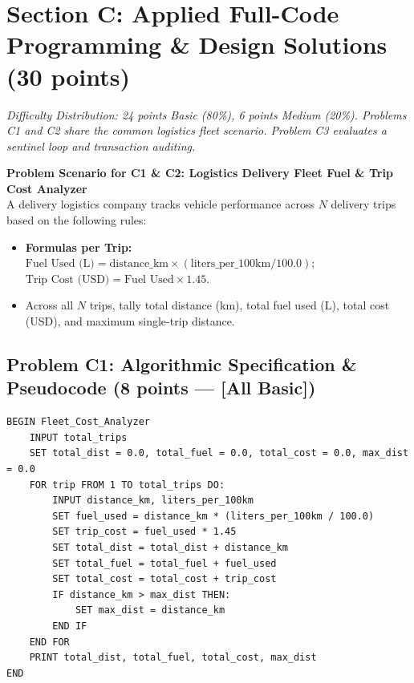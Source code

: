 \documentclass[11pt,a4paper]{article}
\begin{document}
\newpage

\section*{Section C: Applied Full-Code Programming \& Design Solutions (30 points)}
\textit{Difficulty Distribution: 24 points Basic (80\%), 6 points Medium (20\%). Problems C1 and C2 share the common logistics fleet scenario. Problem C3 evaluates a sentinel loop and transaction auditing.}

\begin{tcolorbox}[colback=boxbg, colframe=secondaryteal, arc=1.2mm, boxrule=0.6pt, left=2.0mm, right=2.0mm, top=0.6mm, bottom=0.6mm]
\textbf{\small Problem Scenario for C1 \& C2: Logistics Delivery Fleet Fuel \& Trip Cost Analyzer}\\[0.1mm]
\footnotesize
A delivery logistics company tracks vehicle performance across $N$ delivery trips based on the following rules:
\begin{itemize}[itemsep=0.1pt,topsep=0.1pt]
  \item \textbf{Formulas per Trip:}
    $\text{Fuel Used (L)} = \text{distance\_km} \times (\text{liters\_per\_100km} / 100.0)$; \quad
    $\text{Trip Cost (USD)} = \text{Fuel Used} \times 1.45$.
  \item Across all $N$ trips, tally total distance (km), total fuel used (L), total cost (USD), and maximum single-trip distance.
\end{itemize}
\end{tcolorbox}

\vspace{0.2mm}
\subsection*{Problem C1: Algorithmic Specification \& Pseudocode (8 points --- [All Basic])}

\begin{lstlisting}[language={}]
BEGIN Fleet_Cost_Analyzer
    INPUT total_trips
    SET total_dist = 0.0, total_fuel = 0.0, total_cost = 0.0, max_dist = 0.0
    FOR trip FROM 1 TO total_trips DO:
        INPUT distance_km, liters_per_100km
        SET fuel_used = distance_km * (liters_per_100km / 100.0)
        SET trip_cost = fuel_used * 1.45
        SET total_dist = total_dist + distance_km
        SET total_fuel = total_fuel + fuel_used
        SET total_cost = total_cost + trip_cost
        IF distance_km > max_dist THEN:
            SET max_dist = distance_km
        END IF
    END FOR
    PRINT total_dist, total_fuel, total_cost, max_dist
END
\end{lstlisting}
\end{document}
